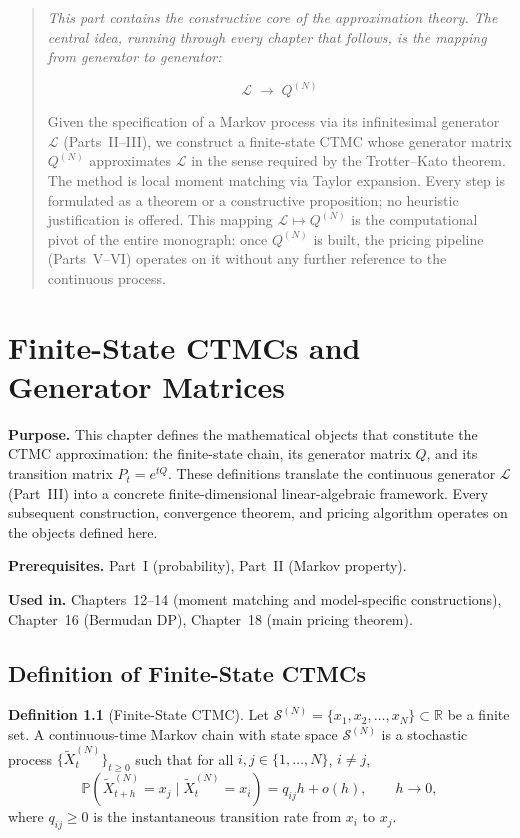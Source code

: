 \documentclass[11pt,a4paper,openany]{book}
\theoremstyle{definition}
\newtheorem{definition}{Definition}[chapter]
\theoremstyle{plain}
\theoremstyle{remark}
\newcommand{\1}{\mathbbm{1}}
\newcommand{\R}{\mathbb{R}}
\newcommand{\Pbb}{\mathbb{P}}
\newcommand{\calS}{\mathcal{S}}
\begin{document}
\begin{quote}
\itshape This part contains the constructive core of the approximation theory. The central idea, running through every chapter that follows, is the mapping from generator to generator:

\[
\boxed{\mathcal{L} \;\longrightarrow\; Q^{(N)}}
\]

Given the specification of a Markov process via its infinitesimal generator $\mathcal{L}$ (Parts~II--III), we construct a finite-state CTMC whose generator matrix $Q^{(N)}$ approximates $\mathcal{L}$ in the sense required by the Trotter--Kato theorem. The method is local moment matching via Taylor expansion. Every step is formulated as a theorem or a constructive proposition; no heuristic justification is offered. This mapping $\mathcal{L} \mapsto Q^{(N)}$ is the computational pivot of the entire monograph: once $Q^{(N)}$ is built, the pricing pipeline (Parts~V--VI) operates on it without any further reference to the continuous process.
\end{quote}

\chapter{Finite-State CTMCs and Generator Matrices}

\noindent\textbf{Purpose.} This chapter defines the mathematical objects that constitute the CTMC approximation: the finite-state chain, its generator matrix $Q$, and its transition matrix $P_{t} = e^{tQ}$. These definitions translate the continuous generator $\mathcal{L}$ (Part~III) into a concrete finite-dimensional linear-algebraic framework. Every subsequent construction, convergence theorem, and pricing algorithm operates on the objects defined here.

\textbf{Prerequisites.} Part~I (probability), Part~II (Markov property).

\textbf{Used in.} Chapters~12--14 (moment matching and model-specific constructions), Chapter~16 (Bermudan DP), Chapter~18 (main pricing theorem).

\section{Definition of Finite-State CTMCs}

\begin{definition}[Finite-State CTMC]
Let $\calS^{(N)} = \{x_{1}, x_{2}, \ldots, x_{N}\} \subset \R$ be a finite set. A continuous-time Markov chain with state space $\calS^{(N)}$ is a stochastic process $\{\widetilde{X}_{t}^{(N)}\}_{t \geq 0}$ such that for all $i, j \in \{1, \ldots, N\}$, $i \neq j$,
\[
\Pbb\left(\widetilde{X}_{t+h}^{(N)} = x_{j} \mid \widetilde{X}_{t}^{(N)} = x_{i}\right) = q_{ij} h + o(h), \qquad h \to 0,
\]
where $q_{ij} \geq 0$ is the instantaneous transition rate from $x_{i}$ to $x_{j}$.
\end{definition}
\end{document}
